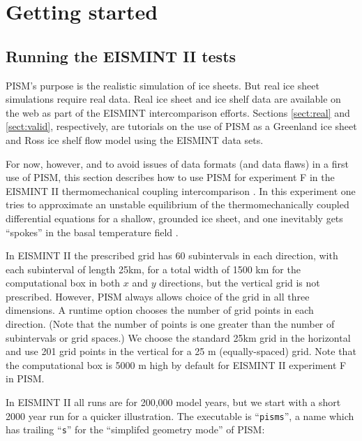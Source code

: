 \documentclass[11pt,final]{amsart}
\renewcommand{\t}[1]{\texttt{#1}}
\begin{document}
\clearpage\newpage
\section{Getting started}\label{sect:start}

\subsection{Running the EISMINT II tests}  PISM's purpose is the realistic simulation of ice sheets.  But real ice sheet simulations require real data.  Real ice sheet and ice shelf data are available on the web as part of the EISMINT intercomparison efforts.  Sections \ref{sect:real} and \ref{sect:valid}, respectively, are tutorials on the use of PISM as a Greenland ice sheet and Ross ice shelf flow model using the EISMINT data sets.

For now, however, and to avoid issues of data formats (and data flaws) in a first use of PISM, this section describes how to use PISM for experiment F in the EISMINT II thermomechanical coupling intercomparison \cite{EISMINT00}.  In this experiment one tries to approximate an unstable equilibrium of the thermomechanically coupled differential equations for a shallow, grounded ice sheet, and one inevitably gets ``spokes'' in the basal temperature field \cite{BBL,PayneBaldwin}.  

In EISMINT II the prescribed grid has 60 subintervals in each direction, with each subinterval of length 25km, for a total width of 1500 km for the computational box in both $x$ and $y$ directions, but the vertical grid is not prescribed.  However, PISM always allows choice of the grid in all three dimensions.  A runtime option chooses the number of grid points in each direction.  (Note that the number of points is one greater than the number of subintervals or grid spaces.)  We choose the standard 25km grid in the horizontal and use 201 grid points in the vertical for a 25 m (equally-spaced) grid.  Note that the computational box is 5000 m high by default for EISMINT II experiment F in PISM.  

In EISMINT II all runs are for 200,000 model years, but we start with a short 2000 year run for a quicker illustration.  The executable is ``\t{pisms}'', a name which has trailing ``\t{s}'' for the ``simplifed geometry mode'' of PISM:
\end{document}
